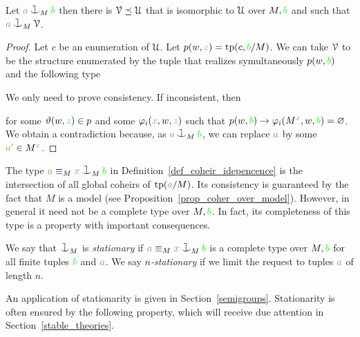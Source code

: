 \begin{proposition}\label{prop_saturate_heir}
  Let ${\mr a}\cnonfork_M{\gr b}$ then there is $\EuScript V\preceq\EuScript U$ that is isomorphic to $\EuScript U$ over $M,{\color{green} b}$ and such that ${\mr a}\cnonfork_M\V$.
\end{proposition}

\begin{proof}
  Let $c$ be an enumeration of $\EuScript U$.
  Let $p(w,{\color{green} z})={\rm tp}(c,{\color{green} b}/M)$.
  We can take $\EuScript V$ to be the structure enumerated by the tuple that realizes symultaneously $p(w,{\color{green} b}) $ and the following type 


  We only need to prove consistency.
  If inconsistent, then 

  
  for some $\vartheta(w,{\color{green} z})\in p$ and some $\varphi_i({\color{brown} x},w,{\color{green} z})$ such that $p(w,{\color{green} b})\rightarrow\varphi_i(M^{\color{brown} x},w,{\color{green} b})=\varnothing$.
  We obtain a contradiction because, as ${\mr a}\cnonfork_M{\gr b}$, we can replace ${\color{brown} a}$ by some ${\color{brown} a'}\in M^{\color{brown} x}$.
\end{proof}


The type ${\mr a}\equiv_M{\mr x}\cnonfork_M{\gr b}$ in Definition~\ref{def_coheir_idepencence} is the intersection of all global coheirs of ${\rm tp}({\color{brown} a}/M)$.
%
Its consistency is guaranteed by the fact that $M$ is a model (see Proposition~\ref{prop_coher_over_model}).
%
However, in general it need not be a complete type over $M,{\color{green} b}$.
%
In fact, its completeness of this type is a property with important consequences.

\begin{definition}\label{def_coheir_stationary} We say that $\cnonfork_M$ is \emph{stationary\/} if ${\mr a}\equiv_M{\mr x}\cnonfork_M{\gr b}$ is a complete type over $M,{\color{green} b}$ for all finite tuples ${\color{green} b}$ and ${\color{brown} a}$.
We say \emph{$n$-stationary\/} if we limit the request to tuples ${\color{brown} a}$ of length $n$.
\end{definition}

An application of stationarity is given in Section~\ref{semigroups}.
Stationarity is often ensured by the following property, which will receive due attention in Section~\ref{stable_theories}.

